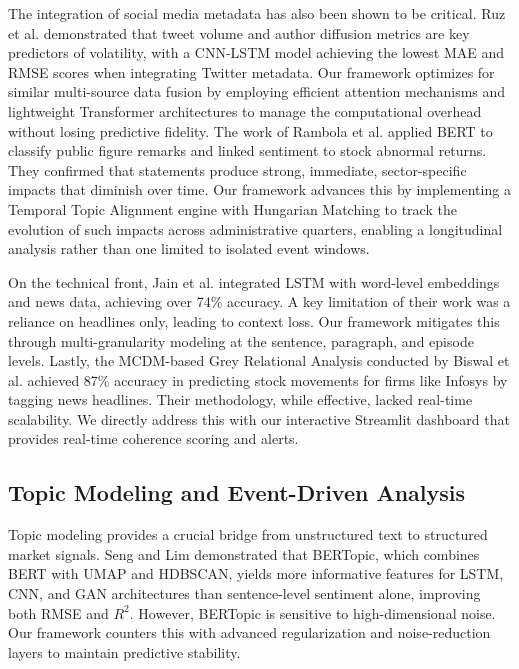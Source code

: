 \documentclass[11pt]{article}
\begin{document}
The integration of social media metadata has also been shown to be critical. Ruz et al. \cite{ruz2024} demonstrated that tweet volume and author diffusion metrics are key predictors of volatility, with a CNN-LSTM model achieving the lowest MAE and RMSE scores when integrating Twitter metadata. Our framework optimizes for similar multi-source data fusion by employing efficient attention mechanisms and lightweight Transformer architectures to manage the computational overhead without losing predictive fidelity. The work of Rambola et al. \cite{rambola2021} applied BERT to classify public figure remarks and linked sentiment to stock abnormal returns. They confirmed that statements produce strong, immediate, sector-specific impacts that diminish over time. Our framework advances this by implementing a Temporal Topic Alignment engine with Hungarian Matching to track the evolution of such impacts across administrative quarters, enabling a longitudinal analysis rather than one limited to isolated event windows.

On the technical front, Jain et al. \cite{jain2023} integrated LSTM with word-level embeddings and news data, achieving over 74\% accuracy. A key limitation of their work was a reliance on headlines only, leading to context loss. Our framework mitigates this through multi-granularity modeling at the sentence, paragraph, and episode levels. Lastly, the MCDM-based Grey Relational Analysis conducted by Biswal et al. \cite{biswal2022} achieved 87\% accuracy in predicting stock movements for firms like Infosys by tagging news headlines. Their methodology, while effective, lacked real-time scalability. We directly address this with our interactive Streamlit dashboard that provides real-time coherence scoring and alerts.

\subsection{Topic Modeling and Event-Driven Analysis}

Topic modeling provides a crucial bridge from unstructured text to structured market signals. Seng and Lim \cite{seng2023} demonstrated that BERTopic, which combines BERT with UMAP and HDBSCAN, yields more informative features for LSTM, CNN, and GAN architectures than sentence-level sentiment alone, improving both RMSE and $R^2$. However, BERTopic is sensitive to high-dimensional noise. Our framework counters this with advanced regularization and noise-reduction layers to maintain predictive stability.
\end{document}
